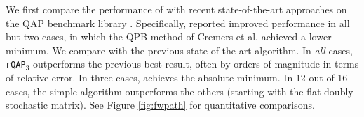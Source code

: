 \documentclass[10pt,journal,cspaper,compsoc]{IEEEtran}
\begin{document}
We first compare the performance of \rqapm with recent state-of-the-art approaches on the QAP benchmark library \cite{Burkard1997}.  Specifically, \cite{Zaslavskiy2009} reported improved performance in all but two cases, in which the QPB method of Cremers et al. \cite{Schellewald2001} achieved a lower minimum.  We compare \rqapm with the previous state-of-the-art algorithm.  In \emph{all} cases, \texttt{rQAP}$_3$ outperforms the previous best result, often by orders of magnitude in terms of relative error. In three cases, \rqapb achieves the absolute minimum.  In 12 out of 16 cases, the simple \rqapa algorithm outperforms the others (starting with the flat doubly stochastic matrix).  See Figure \ref{fig:fwpath} for quantitative comparisons.


\end{document}
